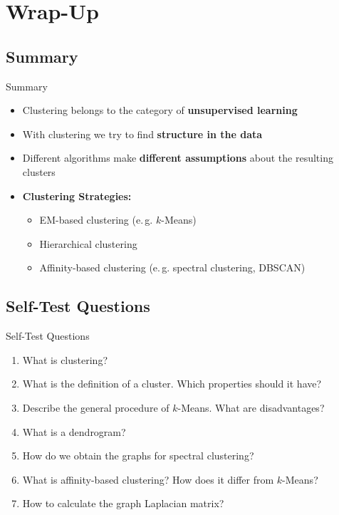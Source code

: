 \section{Wrap-Up}

\subsection{Summary}

\begin{frame}{Summary}{}
	\begin{itemize}
		\item Clustering belongs to the category of \textbf{unsupervised learning}
		\item With clustering we try to find \textbf{structure in the data}
		\item Different algorithms make \textbf{different assumptions} about the resulting clusters
		\item \textbf{Clustering Strategies:}
		\begin{itemize}
			\item EM-based clustering (e.\,g. $k$-Means)
			\item Hierarchical clustering
			\item Affinity-based clustering (e.\,g. spectral clustering, DBSCAN)
		\end{itemize}
	\end{itemize}
\end{frame}


\subsection{Self-Test Questions}

\begin{frame}{Self-Test Questions}{}\important
	\begin{enumerate}
		\item What is clustering?
		\item What is the definition of a cluster. Which properties should it have?
		\item Describe the general procedure of $k$-Means. What are disadvantages?
		\item What is a dendrogram?
		\item How do we obtain the graphs for spectral clustering?
		\item What is affinity-based clustering? How does it differ from $k$-Means?
		\item How to calculate the graph Laplacian matrix?
	\end{enumerate}
\end{frame}


